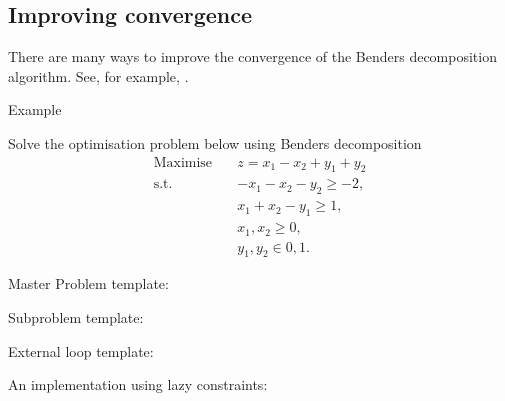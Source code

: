 \subsection*{Improving convergence}

There are many ways to improve the convergence of the Benders decomposition algorithm. See, for example, \cite{costa05survey,rahmaniani17benders}.


\newpage

\begin{bclogo}[logo=\bccrayon]{\small Example }
\vspace{.2cm} \small


Solve the optimisation problem below using Benders decomposition
\begin{align*}
\textrm{Maximise} \quad & z = x_1 - x_2 + y_1 + y_2 \\
\textrm{s.t.} \quad & -x_1 - x_2 - y_2 \geq -2, \\
& x_1 +  x_2 - y_1 \geq 1, \\
& x_1, x_2 \geq 0, \\
& y_1, y_2 \in {0,1}.
\end{align*}
\end{bclogo}
\vspace{0.1cm}


\begin{bclogo}[logo=\bcinfo]{\small Master Problem template:}
\vspace{.2cm} \tiny

\end{bclogo}



\begin{bclogo}[logo=\bcinfo]{\small Subproblem template:}
\vspace{.2cm} \tiny



\end{bclogo}


\begin{bclogo}[logo=\bcinfo]{\small External loop template:}
\vspace{.2cm} \tiny




\vspace{.2cm}
\end{bclogo}


\newpage
\begin{bclogo}[logo=\bcinfo]{\small An implementation using lazy constraints:}
\vspace{.2cm} \tiny




\vspace{.2cm}
\end{bclogo}

\newpage

     

